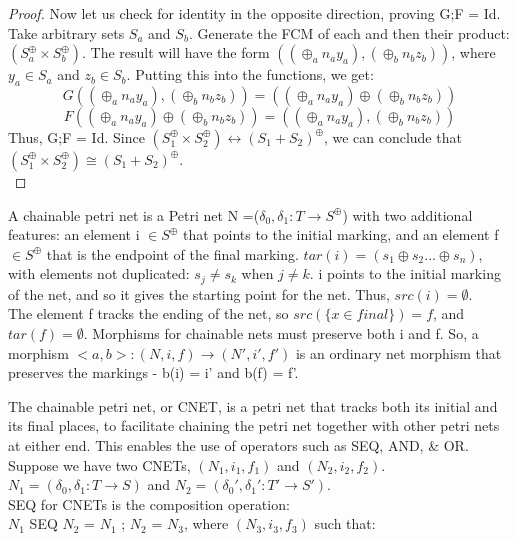 \begin{lemma}
\begin{proof}
Now let us check for identity in the opposite direction, proving G;F = Id.\\
Take arbitrary sets $S_a$ and $S_b$. Generate the FCM of each and then their product: $(S_a^\oplus \times S_b^\oplus)$. The result will have the form $((\oplus_a n_a y_a), (\oplus_b n_b z_b))$, where $y_a \in S_a$ and $z_b \in S_b$. Putting this into the functions, we get:\\ 
\[G((\oplus_a n_a y_a), (\oplus_b n_b z_b)) = ((\oplus_a n_a y_a) \oplus (\oplus_b n_b z_b))\] 
\[F((\oplus_a n_a y_a) \oplus (\oplus_b n_b z_b)) = ((\oplus_a n_a y_a), (\oplus_b n_b z_b))\]
Thus, G;F = Id. 
Since $(S_1 ^\oplus \times S_2 ^\oplus) \leftrightarrow (S_1 + S_2)^\oplus$, we can conclude that $(S_1 ^\oplus \times S_2 ^\oplus) \cong (S_1 + S_2)^\oplus$.\\
\end{proof}
%
\end{lemma}
%
\begin{definition}
\label{Chainable-Petri-Net}
A chainable petri net is a Petri net N =($\delta_0, \delta_1: T \rightarrow S^\oplus$) with two additional features: an element i $\in S^\oplus$ that points to the initial marking, and an element f $\in S^\oplus$ that is the endpoint of the final marking.  $tar(i)=(s_1 \oplus s_2 ... \oplus s_n)$, with elements not duplicated: $s_j \neq s_k$ when $j \neq k$. i points to the initial marking of the net, and so it gives the starting point for the net. Thus, $src(i) = \emptyset$.\\
The element f tracks the ending of the net, so $src(\{x\in final\})= f$, and $tar(f) = \emptyset$. Morphisms for chainable nets must preserve both i and f. So, a morphism $<a,b>: (N, i, f) \rightarrow (N', i', f')$ is an ordinary net morphism that preserves the markings - b(i) = i' and b(f) = f'. \\
\end{definition}
The chainable petri net, or CNET, is a petri net that tracks both its initial and its final places, to facilitate chaining the petri net together with other petri nets at either end. This enables the use of operators such as SEQ, AND, \& OR.\\
Suppose we have two CNETs, $(N_1, i_1, f_1)$ and $(N_2, i_2, f_2)$. \\
$N_1 = (\delta_0, \delta_1: T \rightarrow S)$ and $N_2 = (\delta_0', \delta_1': T' \rightarrow S')$.\bigskip\\
SEQ for CNETs is the composition operation:\\
$N_1$ SEQ $N_2$ = $N_1$ ; $N_2$ = $N_3$, where $(N_3,  i_3, f_3)$ such that:\\
